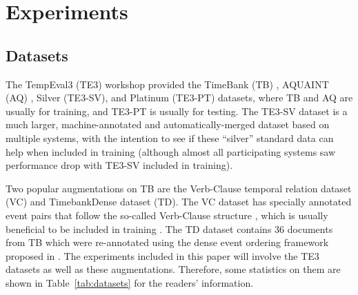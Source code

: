 \documentclass[11pt,letterpaper]{article}
\begin{document}
{ 

 	\section{Experiments}
\label{experiments}

\subsection{Datasets}
The TempEval3 (TE3) workshop \citep{uzzaman2013TE3} provided the TimeBank (TB) \citep{pustejovsky2003timebank}, AQUAINT (AQ) \citep{graff2002aquaint}, Silver (TE3-SV), and Platinum (TE3-PT) datasets, where TB and AQ are usually for training, and TE3-PT is usually for testing. 
The TE3-SV dataset is a much larger, machine-annotated and automatically-merged dataset based on multiple systems, with the intention to see if these ``silver'' standard data can help when included in training (although almost all participating systems saw performance drop with TE3-SV included in training).

Two popular augmentations on TB are the Verb-Clause temporal relation dataset (VC) and TimebankDense dataset (TD). 
The VC dataset has specially annotated event pairs that follow the so-called Verb-Clause structure \citep{bethard2007timelines}, which is usually beneficial to be included in training \citep{uzzaman2013TE3}.
The TD dataset contains 36 documents from TB which were re-annotated using the dense event ordering framework proposed in \citet{cassidy2014annotation}.
The experiments included in this paper will involve the TE3 datasets as well as these augmentations. Therefore, some statistics on them are shown in Table~\ref{tab:datasets} for the readers' information.

}
\end{document}
